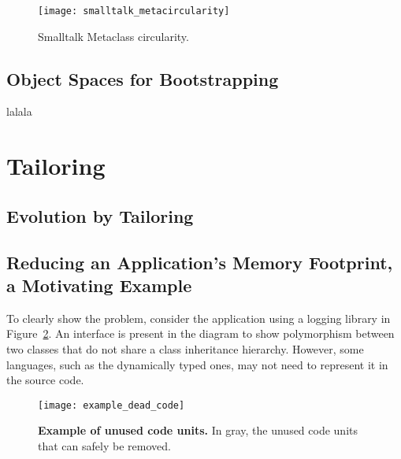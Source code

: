 \begin{figure}[!ht]
\begin{center}
\texttt{[image: smalltalk\_metacircularity]}
\caption{Smalltalk Metaclass circularity.\label{fig:smalltalk_metacircularity}}
\end{center}
\end{figure}

\subsection{Object Spaces for Bootstrapping}

lalala

\section{Tailoring}


\subsection{Evolution by Tailoring} \label{sec:example_intro}

\subsection{Reducing an Application's Memory Footprint, a Motivating Example} \label{sec:example_intro}

To clearly show the problem, consider the application using a logging library in Figure~\ref{fig:example_dead_code}.
An interface is present in the diagram to show polymorphism between two classes that do not share a class inheritance hierarchy. 
However, some languages, such as the dynamically typed ones, may not need to represent it in the source code.

\begin{figure}[ht]
\begin{center}
\texttt{[image: example\_dead\_code]}
\caption{\small\textbf{Example of unused code units.} In gray, the unused code units that can safely be removed.\label{fig:example_dead_code}}
\end{center}
\end{figure}

